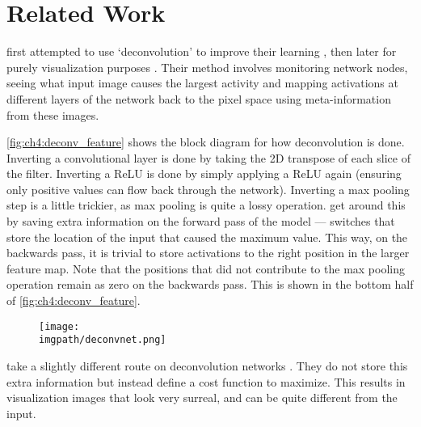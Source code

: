 \section{Related Work}
  \citeauthor{zeiler_adaptive_2011} first attempted to use `deconvolution' to
  improve their learning \cite{zeiler_adaptive_2011}, then later for purely
  visualization purposes \cite{zeiler_visualizing_2014}. Their method
  involves monitoring network nodes, seeing what input image causes the largest
  activity and mapping activations at different layers of the network back to the pixel
  space using meta-information from these images.
  
  \autoref{fig:ch4:deconv_feature} shows the block diagram for how deconvolution is
  done. Inverting a convolutional layer is done by taking the 2D transpose of each
  slice of the filter. Inverting a ReLU is done by simply applying a ReLU again
  (ensuring only positive values can flow back through the network).   
  Inverting
  a max pooling step is a little trickier, as max pooling is quite a lossy
  operation. \citeauthor{zeiler_adaptive_2011} get around this by saving extra
  information on the forward pass of the model --- switches that store the
  location of the input that caused the maximum value. This way, on the
  backwards pass, it is trivial to store activations to the right position in
  the larger feature map. Note that the positions that did not contribute to
  the max pooling operation remain as zero on the backwards pass. This is shown
  in the bottom half of \autoref{fig:ch4:deconv_feature}.

  \begin{figure}
    \centering
      \texttt{[image: \\imgpath/deconvnet.png]}
      \label{fig:ch4:deconv_feature}
  \end{figure}

  \citeauthor{mahendran_understanding_2015} take a slightly different route on
  deconvolution networks \cite{mahendran_understanding_2015}. They do not
  store this extra information but instead define a cost function to maximize. 
  This results in visualization images that look very surreal, and can be
  quite different from the input.

